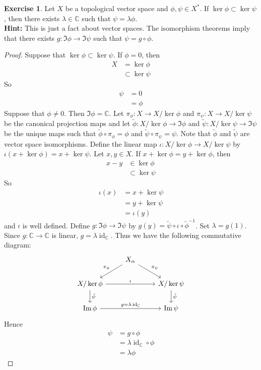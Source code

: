 \documentclass[12pt]{amsart}
\theoremstyle{definition}
\newtheorem{ex}[definition]{Exercise}
\newcommand{\al}{\alpha}
\newcommand{\lam}{\lambda}
\newcommand{\C}{\mathbb{C}}
\newcommand{\tbf}[1]{\textbf{#1}}
\DeclareMathOperator{\id}{id}
\DeclareMathOperator*{\0}{\mbf{0}}
\DeclareMathOperator*{\1}{\mbf{1}}
\begin{document}
	\begin{ex}
		Let $X$ be a topological vector space and $\phi,\psi \in X^*$. If $\ker  \phi \subset \ker \psi$, then there exists $\lam \in \C$ such that $\psi = \lam \phi$.\\
		\tbf{Hint:} This is just a fact about vector spaces. The isomorphism theorems imply that there exists $g: \Im \phi \rightarrow \Im \psi$ such that $\psi = g \circ \phi$. 
	\end{ex}

	\begin{proof}
		Suppose that $\ker  \phi \subset \ker \psi$. If $\phi = 0$, then 
		\begin{align*}
			X 
			& = \ker \phi\\
			& \subset \ker \psi 
		\end{align*}
		So 
		\begin{align*}
			\psi 
			& = 0 \\
			& = \phi
		\end{align*}
		Suppose that $\phi \neq 0$. Then $\Im \phi = \C$. Let $\pi_{\phi}: X \rightarrow X / \ker \phi$ and $\pi_{\psi}: X \rightarrow X / \ker \psi$ be the canonical projection maps and let $\tilde{\phi}: X / \ker \phi \rightarrow \Im \phi$ and $\tilde{\psi}:X / \ker \psi \rightarrow \Im \psi$ be the unique maps such that $\tilde{\phi} \circ \pi_{\phi} = \phi$ and $\tilde{\psi} \circ \pi_{\psi} = \psi$. Note that $\tilde{\phi}$ and $\tilde{\psi}$ are vector space isomorphisms. Define the linear map $\iota: X /\ker \phi \rightarrow X / \ker \psi$ by $\iota(x + \ker \phi) = x + \ker \psi$. Let $x,y \in X$. If $x + \ker \phi = y + \ker \phi$, then 
		\begin{align*}
			x -y 
			& \in \ker \phi \\
			& \subset \ker \psi 
		\end{align*}
		So 
		\begin{align*}
			\iota(x) 
			& = x + \ker \psi \\
			& = y + \ker \psi \\
			& = \iota(y)
		\end{align*}
		and $\iota$ is well defined. Define $g: \Im \phi \rightarrow \Im \psi$ by $g(y) = \tilde{\psi} \circ \iota \circ \tilde{\phi}^{-1}$. Set $\lam = g(1)$. Since $g: \C \rightarrow \C$ is linear, $g = \lam \id_{\C}$. Thus we have the following commutative diagram: 
		\[ \begin{tikzcd}
			& X_{\al} \arrow[dr, "\pi_{\psi}"] \arrow[dl, "\pi_{\phi}"'] &  \\
			X / \ker \phi \arrow[rr, "\iota"] \arrow[d, "\tilde{\psi}"] & & X / \ker \psi  \arrow[d, "\tilde{\psi}"] \\
			\Im \phi \arrow[rr, "g = \lam \id_{\C}"] & & \Im \psi
		\end{tikzcd}
		\]
		Hence 
		\begin{align*}
			\psi
			& = g \circ \phi \\
			& = \lam \id_{\C} \circ \phi \\
			& = \lam \phi
		\end{align*} 
	\end{proof}
\end{document}
